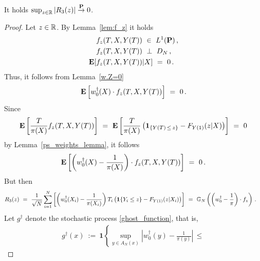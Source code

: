 \begin{lemma}
  \label{aa:mean:r3:lem:conv}
  It holds
  $\sup_{z\in\mathbb{R}}\left| R_3(z) \right|\overset{\mathbf{P}}{\to}0$.
\end{lemma}
\begin{proof}
  Let
  $z\in\mathbb{R}$.
    By Lemma~\ref{lem:f_z}
  it holds 
  \begin{align*}
    &
  f_z(T,X,Y(T))
  \ 
  \in
  \ 
  L^1(\P)\,, 
  \\
  &
  f_z(T,X,Y(T))
  \ 
  \perp
  \ 
  D_N
  \,,
  \\
  \E
  [
  &
  f_z(T,X,Y(T))
    |X
  ]
  \ 
  =
  \ 
  0
  \,.
  \end{align*}
  Thus, 
  it follows from Lemma~\ref{w.Z=0}
  \begin{gather*}
    \E
    \left[
      w_0^\dagger(X)
      \cdot
      f_z(T,X,Y(T))
    \right]
    \ 
    =
    \ 
    0
    \,.
  \end{gather*}
  Since
  \begin{gather*}
    \E
    \left[
      \frac{T}{\pi(X)}
      f_z(T,X,Y(T))
    \right]
    \ 
    =
    \ 
    \E
    \left[
      \frac{T}{\pi(X)}
      \left( 
        \mathbf{1}
        _{\left\{  Y(T)\,\le\,z \right\}}
        -
        F_{Y(1)}(z|X)
      \right)
    \right]
    \  
    =
    \ 
    0
  \end{gather*}
  by Lemma~\ref{ps_weights_lemma},
  it follows
  \begin{align*}
    \E
    \left[ 
      \left( 
      w_0^\dagger(X)
      -
      \frac{1}{\pi(X)}
      \right)
     \cdot
     f_z(T,X,Y(T))
    \right]
    \ 
    =
    \ 
  0
  \,.
  \end{align*}
  But then 
  \begin{align*}
    R_3(z)
    &
    \ 
    =
    \ 
  \frac{1}
  {
\sqrt{N}
  }
    \sum_{i=1}^{N} 
    \left[ 
    \left( 
    w_0^\dagger(X_i) 
    -
    \frac{1}{\pi(X_i)}
    \right)
    T_i
    \left( 
    \mathbf{1}{\left\{ Y_i \le z \right\}}
    -
  F_{Y(1)}(z|X_i)
    \right)
    \right]
    \ 
    =
    \ 
    \G_N
    \left( 
      \left( 
      w_0^\dagger
      -
      \frac{1}{\pi}
      \right)
     \cdot
     f_z
    \right)
    \,.
  \end{align*}
Let
  $g^\dagger$ 
  denote the stochastic process \eqref{ghost_function}, that is,
\begin{align*}
  g^\dagger
  (x)
  \ 
  :=
  \ 
  \mathbf{1}{
    \left\{ 
      \sup_{y\in A_N(x)}
      \left| 
      w_0^\dagger(y)
      -
      \frac{1}{\pi(y)}
      \right|
      \,
      \le
      \,
}
\end{align*}
\end{proof}
